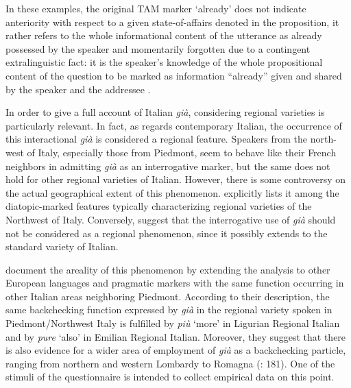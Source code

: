 In these examples, the original TAM marker ‘already’ does not indicate anteriority with respect to a given state-of-affairs denoted in the proposition, it rather refers to the whole informational content of the utterance as already possessed by the speaker and momentarily forgotten due to a contingent extralinguistic fact: it is the speaker’s knowledge of the whole propositional content of the question to be marked as information “already” given and shared by the speaker and the addressee \citep[1999]{Squartini2014}.

In order to give a full account of Italian \textit{già}, considering regional varieties is particularly relevant. In fact, as regards contemporary Italian, the occurrence of this interactional \textit{già} is considered a regional feature. Speakers from the north-west of Italy, especially those from Piedmont, seem to behave like their French neighbors in admitting \textit{già} as an interrogative marker, but the same does not hold for other regional varieties of Italian. However, there is some controversy on the actual geographical extent of this phenomenon. \citet[113–114]{Cerruti2009} explicitly lists it among the diatopic-marked features typically characterizing regional varieties of the Northwest of Italy. Conversely, \citet[55]{BazzanellaEtAl2005} suggest that the interrogative use of \textit{già} should not be considered as a regional phenomenon, since it possibly extends to the standard variety of Italian.

\citet{FedrianiMiola2014} document the areality of this phenomenon by extending the analysis to other European languages and pragmatic markers with the same function occurring in other Italian areas neighboring Piedmont. According to their description, the same backchecking function expressed by \textit{già} in the regional variety spoken in Piedmont/Northwest Italy is fulfilled by \textit{più} ‘more’ in Ligurian Regional Italian and by \textit{pure} ‘also’ in Emilian Regional Italian. Moreover, they suggest that there is also evidence for a wider area of employment of \textit{già} as a backchecking particle, ranging from northern and western Lombardy to Romagna (\citealt{FedrianiMiola2014}: 181). One of the stimuli of the questionnaire is intended to collect empirical data on this point.

